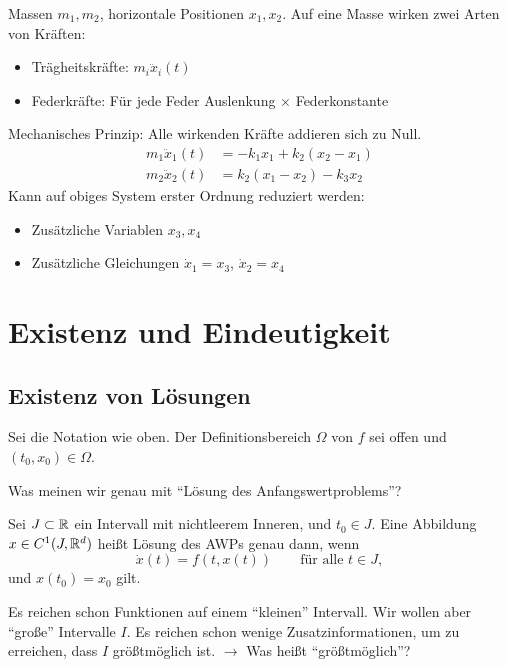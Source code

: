 \begin{enumerate}
 Massen $m_1,m_2$, horizontale Positionen $x_1,x_2$.  Auf eine Masse wirken zwei Arten von Kräften:
 \begin{itemize}
  \item Trägheitskräfte: $m_i \ddot{x}_i(t)$
  \item Federkräfte:  Für jede Feder Auslenkung $\times$ Federkonstante
 \end{itemize}
 Mechanisches Prinzip: Alle wirkenden Kräfte addieren sich zu Null.
 \begin{align*}
	m_1 \ddot{x}_1(t) & =-k_1x_1+k_2 (x_2-x_1 ) \\
	m_2 \ddot{x}_2(t) & =k_2 (x_1-x_2 )-k_3x_2
 \end{align*}
  Kann auf obiges System erster Ordnung reduziert werden:
  \begin{itemize}
   \item Zusätzliche Variablen $x_3,x_4$
   \item Zusätzliche Gleichungen $\dot{x}_1 = x_3$, $\dot{x}_2 = x_4$
  \end{itemize}
\end{enumerate}


\section{Existenz und Eindeutigkeit}

\subsection{Existenz von Lösungen}
Sei die Notation wie oben. Der Definitionsbereich $\Omega$ von $f$ sei offen und $(t_0,x_0) \in \Omega$.

Was meinen wir genau mit \enquote{Lösung des Anfangswertproblems}?

\begin{defi}
Sei $J \subset \mathbb R$ ein Intervall mit nichtleerem Inneren, und $t_0 \in J$. Eine Abbildung $x \in C^1 (J,\mathbb R^d)$
heißt Lösung des AWPs genau dann, wenn
\begin{equation*}
 \dot{x}(t)=f(t,x(t))
 \qquad
 \text{für alle $t \in J$},
\end{equation*}
und $x(t_0)=x_0$ gilt.
\end{defi}

Es reichen schon Funktionen auf einem \enquote{kleinen} Intervall. Wir wollen aber \enquote{große} Intervalle $I$. Es reichen schon wenige Zusatzinformationen, um zu erreichen, dass $I$ größtmöglich ist. $\longrightarrow$ Was heißt \enquote{größtmöglich}?

